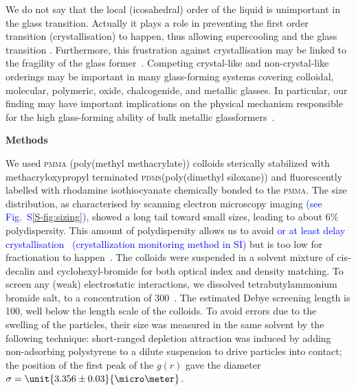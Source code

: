 We do not say that the local (icosahedral) order of the liquid is unimportant in the glass transition. Actually it plays a role in preventing the first order transition (crystallisation) to happen, thus allowing supercooling and the glass transition \cite{TanakaMJPCM}. Furthermore, this frustration against crystallisation may be linked to the fragility of the glass former~\citep{TanakaGJPCM,tanaka2010critical}. Competing crystal-like and non-crystal-like orderings may be important in many glass-forming systems covering colloidal, molecular, polymeric, oxide, chalcogenide, and metallic glasses. In particular, our finding may have important implications on the physical mechanism responsible for the high glass-forming ability of bulk metallic glassformers~\cite{Wang2004}. 

\vspace{1cm}
\noindent
\textbf{Methods}

We used \textsc{pmma} (poly(methyl methacrylate)) colloids sterically stabilized with methacryloxypropyl terminated \textsc{pdms}(poly(dimethyl siloxane)) and fluorescently labelled with rhodamine isothiocyanate chemically bonded to the \textsc{pmma}. The size distribution, as characterised by scanning electron microscopy imaging \textcolor{blue}{(see Fig.~S\ref{S-fig:sizing})}, showed a long tail toward small sizes, leading to about $6\%$ polydispersity. This amount of polydispersity allows us to avoid \textcolor{blue}{or at least delay crystallisation~\cite{Zaccarelli2009} (crystallization monitoring method in SI)} but is too low for fractionation to happen~\citep{Fasolo2003}. The colloids were suspended in a solvent mixture of cis-decalin and cyclohexyl-bromide for both optical index and density matching. To screen any (weak) electrostatic interactions, we dissolved tetrabutylammonium bromide salt, to a concentration of \unit{300}{\nano\mole\per\liter}~\citep{royall2005}. The estimated Debye screening length is \unit{100}{\nano\metre}, well below the length scale of the colloids. To avoid errors due to the swelling of the particles, their size was measured in the same solvent by the following technique: short-ranged depletion attraction was induced by adding non-adsorbing polystyrene to a dilute suspension to drive particles into contact; the position of the first peak of the $g(r)$ gave the diameter $\sigma = \unit{3.356\pm0.03}{\micro\meter}$.


